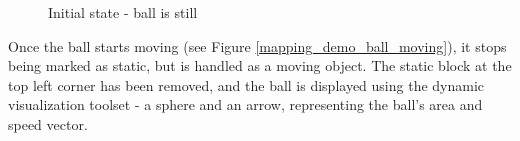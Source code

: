 \begin{figure}[!ht]
    \centering
    \caption{Initial state - ball is still}
    \label{mapping_demo_start}
\end{figure}

Once the ball starts moving (see Figure \ref{mapping_demo_ball_moving}), it stops being marked as static, but is handled as a moving object. The static block at the top left corner has been removed, and the ball is displayed using the dynamic visualization toolset - a sphere and an arrow, representing the ball's area and speed vector.

